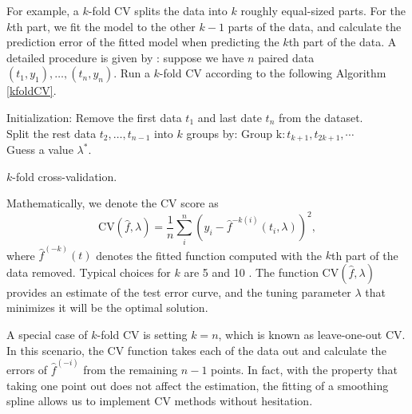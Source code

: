 For example, a $k$-fold CV splits the data into $k$ roughly equal-sized parts. For the $k$th part, we fit the model to the other $k-1$ parts
of the data, and calculate the prediction error of the fitted model when
predicting the $k$th part of the data. A detailed procedure is given by \cite{wahba1975completely}: suppose we have $n$ paired data $(t_1,y_1), \ldots, (t_n,y_n)$. Run a $k$-fold CV according to the following Algorithm \ref{kfoldCV}. 
\begin{algorithm}[h]
\SetAlgoLined 
Initialization: Remove the first data $t_1$ and last date $t_n$ from the dataset. \\
Split the rest data $t_2,\ldots,t_{n-1}$ into $k$ groups by: $ \mbox{Group k} : t_{k+1}, t_{2k+1}, \cdots$ \\
Guess a value $\lambda^*$. \\
 \caption{$k$-fold cross-validation.}\label{kfoldCV}
\end{algorithm}
Mathematically, we denote the CV score as 
\begin{equation*}
\mbox{CV}(\hat{f},\lambda) = \frac{1}{n}\sum_i^n \left( y_i -\hat{f}^{-k(i)}(t_i,\lambda) \right)^2,
\end{equation*}
where $\hat{f}^{(-k)}(t)$ denotes the fitted function computed with the $k$th part of the data removed. Typical choices for $k$ are 5 and 10 \cite{esl2009}.  The function $\mbox{CV}(\hat{f},\lambda)$ provides an estimate of the test error curve, and the tuning parameter $\lambda$ that minimizes it will be the optimal solution. 

A special case of $k$-fold CV is setting $k=n$, which is known as leave-one-out CV. In this scenario, the CV function takes each of the data out and calculate the errors of $\hat{f}^{(-i)}$ from the remaining $n-1$ points. In fact, with the property that taking one point out does not affect the estimation, the fitting of a smoothing spline allows us to implement CV methods without hesitation. 

